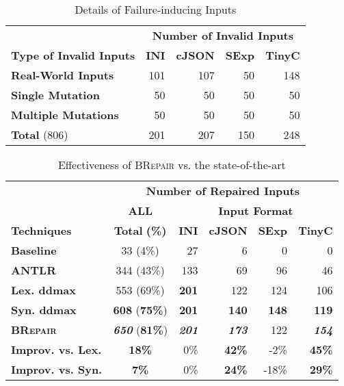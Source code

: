 \documentclass[sigconf,review,anonymous]{acmart}
\newcommand{\approach}{\textsc{BRepair}\xspace}
\begin{document}




\begin{table}[!tbp]\centering
\caption{Details of Failure-inducing Inputs}
\begin{tabular}{|l | r | r | r | r |}
\hline
&  \multicolumn{4}{c|}{\textbf{Number of Invalid Inputs}}  \\
\textbf{Type of Invalid Inputs} & \textbf{INI} & \textbf{cJSON} & \textbf{SExp} & \textbf{TinyC} \\
\hline
\textbf{Real-World Inputs} & 101 & 107 & 50 & 148 \\
\textbf{Single Mutation} & 50 & 50 & 50 & 50 \\
\textbf{Multiple Mutations} & 50 & 50 & 50 & 50 \\
\hline
\textbf{Total } (806) & 201 & 207 & 150 & 248 \\
\hline
\end{tabular}
\label{tab:input-details}
\end{table}


\begin{table}[!tbp]\centering
\caption{Effectiveness of \approach vs. the state-of-the-art}
\begin{tabular}{|l | c | r  r  r  r |}
\hline
&  \multicolumn{5}{c|}{\textbf{Number of Repaired Inputs}}  \\
&  \multicolumn{1}{c|}{\textbf{ALL}} & \multicolumn{4}{c|}{\textbf{Input Format}}  \\
\textbf{Techniques} & \textbf{Total} \textbf{(\%)} & \textbf{INI} & \textbf{cJSON} & \textbf{SExp} & \textbf{TinyC} \\
\hline
\textbf{Baseline}   & 33 (4\%) & 27	 & 6 &	0	& 0\\
\textbf{ANTLR} & 344 (43\%) & 133 & 69 & 96 &  46   \\
\textbf{Lex. ddmax} & 553 (69\%) & \textbf{201}  & 122  & 124 & 106    \\ 			
\textbf{Syn. ddmax} & \textbf{608} (\textbf{75\%}) & \textbf{201}  & \textbf{140}  & \textbf{148}  & \textbf{119}  \\ 	
\hline
\textbf{\approach}  & \textit{ \textbf{650}} (\textbf{81\%}) & \textit{ \textbf{201}} & \textit{ \textbf{173}}  & 122  & \textit{ \textbf{154}} \\
\hline
\textbf{Improv. vs. Lex.} &  \textbf{18\%}  & 0\% & \textbf{42\%} & -2\% & \textbf{45\%} \\
\textbf{Improv. vs. Syn.} &  \textbf{7\%}  & 0\% & \textbf{24\%} & -18\% & \textbf{29\%} \\
\hline
\end{tabular}
\label{tab:effectiveness}
\end{table}
\end{document}
